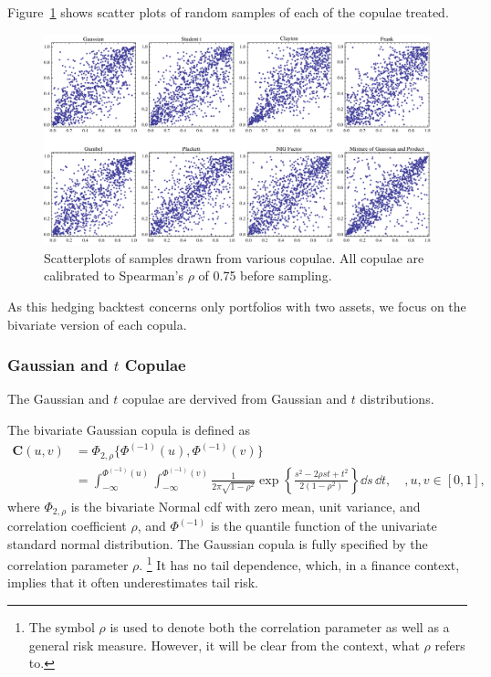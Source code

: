 Figure~\ref{fig:copulaeScatterPlot} shows scatter plots of random
samples of each of the copulae treated. 
\begin{figure}[t]
    \centering
  \includegraphics[width=\textwidth]{_pics/copulas_scatterplots.pdf}
  \caption{Scatterplots of samples drawn from various copulae. All
    copulae are calibrated to Spearman's $\rho$ of 0.75 before
    sampling.}\label{fig:copulaeScatterPlot} 
\end{figure}

As this hedging backtest concerns only portfolios with two assets, we
focus on the bivariate version of each copula. 

\subsubsection{Gaussian and $t$ Copulae}\label{sec:ellpitical-copulae}

The Gaussian and $t$ copulae are dervived from Gaussian and $t$
distributions. 

The bivariate Gaussian copula is defined as
\begin{align*}
  \bm{C}(u,v) &= \Phi_{2, \rho}\{\Phi^{(-1)}(u), \Phi^{(-1)}(v)\} \nonumber \\
              &= \int_{-\infty}^{\Phi^{(-1)}(u)}
                \int_{-\infty}^{\Phi^{(-1)}(v)}
                \frac{1}{2\pi\sqrt{1-\rho^2}}
                \exp{\left\{
                \frac{s^2-2\rho st+t^2}{2(1-\rho^2)}
                \right\}} \dd s\, \dd t,\quad, u,v\in [0,1],
\end{align*}
where $\Phi_{2, \rho}$ is the bivariate Normal cdf
with zero mean, unit variance, and correlation coefficient $\rho$, and
$\Phi^{(-1)}$ is the quantile function of the univariate standard normal
distribution.
The Gaussian copula is fully specified by the correlation parameter $\rho$. \footnote{
The symbol $\rho$ is used to denote both the correlation parameter as
well as a general risk measure. However, it will be clear from the
context, what $\rho$ refers to.}
It has no tail dependence, which, in a finance context, implies that
it often underestimates tail risk.  

